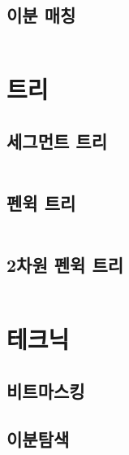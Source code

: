 \documentclass{article}
\begin{document}
\begin{multicols}{2}
\subsection{이분 매칭}
\inputminted{python}{codes/bimatch.py}

\section{트리}
\subsection{세그먼트 트리}
\inputminted{cpp}{codes/segtree.cpp}
\subsection{펜윅 트리}
\inputminted{python}{codes/fenwick.py}
\subsection{2차원 펜윅 트리}
\inputminted{python}{codes/fenwick2d.py}

\section{테크닉}
\subsection{비트마스킹}
\subsection{이분탐색}
\inputminted{python}{codes/bisect.py}


\end{multicols}
%
%
	
\end{document}
